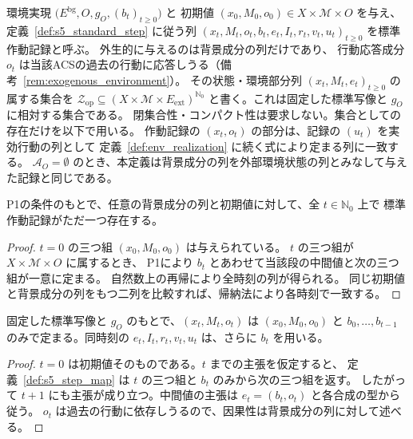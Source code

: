 \begin{definition}[標準作動記録]
\label{def:s5_operation_record}
環境実現 $\bigl(E^{\mathrm{bg}},O,g_O,(b_t)_{t\ge0}\bigr)$ と
初期値 $(x_0,M_0,o_0)\in X\times\mathcal M\times O$ を与え、
定義~\ref{def:s5_standard_step} に従う列
$(x_t,M_t,o_t,b_t,e_t,I_t,r_t,v_t,u_t)_{t\ge0}$ を標準作動記録と呼ぶ。
外生的に与えるのは背景成分の列だけであり、
行動応答成分 $o_t$ は当該ACSの過去の行動に応答しうる（備考~\ref{rem:exogenous_environment}）。
その状態・環境部分列 $(x_t,M_t,e_t)_{t\ge0}$ の属する集合を
$\mathcal Z_{\mathrm{op}}\subseteq(X\times\mathcal M\times E_{\mathrm{ext}})^{\mathbb N_0}$
と書く。これは固定した標準写像と $g_O$ に相対する集合である。
閉集合性・コンパクト性は要求しない。集合としての存在だけを以下で用いる。
作動記録の $(x_t,o_t)$ の部分は、記録の $(u_t)$ を実効行動の列として
定義~\ref{def:env_realization} に続く式により定まる列に一致する。
$\mathcal A_O=\emptyset$ のとき、本定義は背景成分の列を外部環境状態の列とみなして与えた記録と同じである。
\end{definition}

\begin{proposition}[P2：数学的作動記録の継続]
\label{prop:s5_continuation}
P1の条件のもとで、任意の背景成分の列と初期値に対して、全 $t\in\mathbb N_0$ 上で
標準作動記録がただ一つ存在する。
\end{proposition}
\begin{proof}
$t=0$ の三つ組 $(x_0,M_0,o_0)$ は与えられている。
$t$ の三つ組が $X\times\mathcal M\times O$ に属するとき、
P1により $b_t$ とあわせて当該段の中間値と次の三つ組が一意に定まる。
自然数上の再帰により全時刻の列が得られる。
同じ初期値と背景成分の列をもつ二列を比較すれば、帰納法により各時刻で一致する。
\end{proof}

\begin{proposition}[P3：作動記録の因果性]
\label{prop:s5_causality}
固定した標準写像と $g_O$ のもとで、$(x_t,M_t,o_t)$ は $(x_0,M_0,o_0)$ と
$b_0,\ldots,b_{t-1}$ のみで定まる。同時刻の $e_t,I_t,r_t,v_t,u_t$ は、さらに $b_t$ を用いる。
\end{proposition}
\begin{proof}
$t=0$ は初期値そのものである。$t$ までの主張を仮定すると、
定義~\ref{def:s5_step_map} は $t$ の三つ組と $b_t$ のみから次の三つ組を返す。
したがって $t+1$ にも主張が成り立つ。中間値の主張は $e_t=(b_t,o_t)$ と各合成の型から従う。
$o_t$ は過去の行動に依存しうるので、因果性は背景成分の列に対して述べる。
\end{proof}


